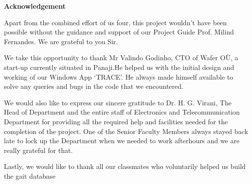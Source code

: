 \begin{center}
\begin{huge}
\bfseries{Acknowledgement}\\
\end{huge}
\end{center}
\vspace{1cm}

\noindent Apart from the combined effort of us four, this project wouldn’t have been possible without the guidance and support of our Project Guide Prof. Milind Fernandes. We are grateful to you Sir.

\noindent We take this opportunity to thank Mr Valindo Godinho, CTO of Wafer OÜ, a start-up currently situated in Panaji.He helped us with the initial design and working of our Windows App ‘TRACE’. He always made himself available to solve any queries and bugs in the code that we encountered.

\noindent We would also like to express our sincere gratitude to Dr. H. G. Virani, The Head of Department and the entire staff of Electronics and Telecommunication Department for providing all the required help and facilities needed for the completion of the project.
One of the Senior Faculty Members always stayed back late to lock up the Department when we needed to work afterhours and we are really grateful for that. 

\noindent Lastly, we would like to thank all our classmates who voluntarily helped us build the gait database 







